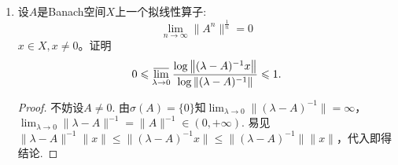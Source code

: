\begin{enumerate}
\begin{proof}
        (iv)根据定理4.2.3，只需证这是单射. 记$\mathbf{C}_{a}$的极大理想空间为$\Delta$. 若$\varphi_1,\varphi_2\in\Delta$使得$\varphi_1(a)=\varphi_2(a)$，
        则对任意$b\in\mathbf{C}_a$，取$\{f_n\}\subseteq\hol(a)$使得$f_n(a)\to b$，由$\varphi_1,\varphi_2$的连续性可得
        \[\varphi_1(b)=\lim_{n\to\infty}\varphi_1(f_n(a))=\lim_{n\to\infty}f_n(\varphi_1(a))=\lim_{n\to\infty}f_n(\varphi_2(a))=\lim_{n\to\infty}\varphi_2(f_n(a))=\varphi_2(b),\]
        故$\varphi_1=\varphi_2$.
    \end{proof}
    \item 设$A$是Banach空间$X$上一个拟线性算子:$$\lim_{n\to\infty}\|A^{n}\|^{\frac{1}{n}}=0$$ $x\in X,x\neq 0$。证明
    $$0\leqslant\varlimsup_{\lambda\to 0}\dfrac{\log\left\lVert (\lambda-A)^{-1}x\right\rVert}{\log\left\lVert (\lambda-A)^{-1}\right\rVert}\leqslant 1.$$
    \begin{proof}
        不妨设$A\neq0$. 由$\sigma(A)=\{0\}$知$\displaystyle\lim_{\lambda\to0}\|(\lambda-A)^{-1}\|=\infty$，$\displaystyle\lim_{\lambda\to0}\|\lambda-A\|^{-1}=\|A\|^{-1}\in(0,+\infty)$.
        易见$\|\lambda-A\|^{-1}\|x\|\leqslant\|(\lambda-A)^{-1}x\|\leqslant\|(\lambda-A)^{-1}\|\|x\|$，代入即得结论.
    \end{proof}
\end{enumerate}

